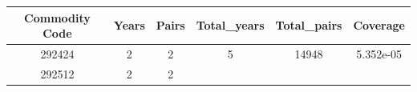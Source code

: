 \documentclass[10pt,]{article}
\begin{document}
\begin{longtable}[]{@{}cccccc@{}}
\toprule
\begin{minipage}[b]{0.20\columnwidth}\centering\strut
Commodity Code\strut
\end{minipage} & \begin{minipage}[b]{0.09\columnwidth}\centering\strut
Years\strut
\end{minipage} & \begin{minipage}[b]{0.09\columnwidth}\centering\strut
Pairs\strut
\end{minipage} & \begin{minipage}[b]{0.16\columnwidth}\centering\strut
Total\_years\strut
\end{minipage} & \begin{minipage}[b]{0.16\columnwidth}\centering\strut
Total\_pairs\strut
\end{minipage} & \begin{minipage}[b]{0.12\columnwidth}\centering\strut
Coverage\strut
\end{minipage}\tabularnewline
\midrule
\endhead
\begin{minipage}[t]{0.20\columnwidth}\centering\strut
292424\strut
\end{minipage} & \begin{minipage}[t]{0.09\columnwidth}\centering\strut
2\strut
\end{minipage} & \begin{minipage}[t]{0.09\columnwidth}\centering\strut
2\strut
\end{minipage} & \begin{minipage}[t]{0.16\columnwidth}\centering\strut
5\strut
\end{minipage} & \begin{minipage}[t]{0.16\columnwidth}\centering\strut
14948\strut
\end{minipage} & \begin{minipage}[t]{0.12\columnwidth}\centering\strut
5.352e-05\strut
\end{minipage}\tabularnewline
\begin{minipage}[t]{0.20\columnwidth}\centering\strut
292512\strut
\end{minipage} & \begin{minipage}[t]{0.09\columnwidth}\centering\strut
2\strut
\end{minipage} & \begin{minipage}[t]{0.09\columnwidth}\centering\strut
2\strut
\end{minipage} & \begin{minipage}[t]{0.16\columnwidth}\centering\strut

\end{minipage}
\end{longtable}
\end{document}
